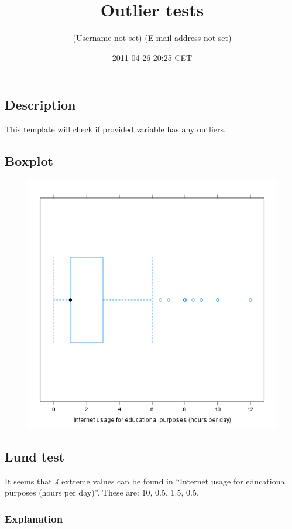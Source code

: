 \documentclass[]{article}
\title{Outlier tests}
\author{(Username not set) (E-mail address not set)}
\date{2011-04-26 20:25 CET}
\makeatletter
\def\maxwidth{\ifdim\Gin@nat@width>\linewidth\linewidth
\else\Gin@nat@width\fi}
\let\Oldincludegraphics\includegraphics
\renewcommand{\includegraphics}[1]{\Oldincludegraphics[width=\maxwidth]{#1}}
\makeatother
\begin{document}
\maketitle

\subsection{Description}

This template will check if provided variable has any outliers.

\subsection{Boxplot}

\begin{figure}[htbp]
\centering
\includegraphics{d24b3eb41da4d1de21d4bce0e30d2e1b.png}
\caption{}
\end{figure}

\subsection{Lund test}

It seems that \emph{4} extreme values can be found in ``Internet usage
for educational purposes (hours per day)''. These are: 10, 0.5, 1.5,
0.5.

\subsubsection{Explanation}
\end{document}
